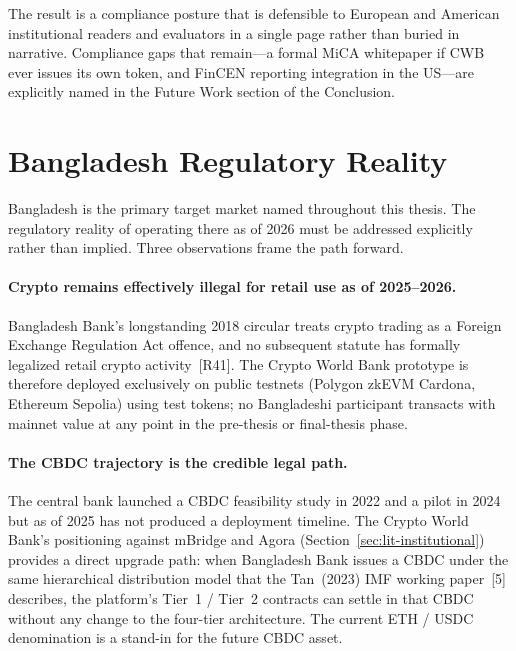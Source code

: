 \documentclass[12pt,a4paper]{report}
\begin{document}
The result is a compliance posture that is defensible to European and American institutional readers and evaluators in a single page rather than buried in narrative. Compliance gaps that remain---a formal MiCA whitepaper if CWB ever issues its own token, and FinCEN reporting integration in the US---are explicitly named in the Future Work section of the Conclusion.

\section{Bangladesh Regulatory Reality}
\label{sec:bangladesh-reg}

Bangladesh is the primary target market named throughout this thesis. The regulatory reality of operating there as of 2026 must be addressed explicitly rather than implied. Three observations frame the path forward.

\paragraph{Crypto remains effectively illegal for retail use as of 2025--2026.}
Bangladesh Bank's longstanding 2018 circular treats crypto trading as a Foreign Exchange Regulation Act offence, and no subsequent statute has formally legalized retail crypto activity~[R41]. The Crypto World Bank prototype is therefore deployed exclusively on public testnets (Polygon zkEVM Cardona, Ethereum Sepolia) using test tokens; no Bangladeshi participant transacts with mainnet value at any point in the pre-thesis or final-thesis phase.

\paragraph{The CBDC trajectory is the credible legal path.}
The central bank launched a CBDC feasibility study in 2022 and a pilot in 2024 but as of 2025 has not produced a deployment timeline. The Crypto World Bank's positioning against mBridge and Agora (Section~\ref{sec:lit-institutional}) provides a direct upgrade path: when Bangladesh Bank issues a CBDC under the same hierarchical distribution model that the Tan~(2023) IMF working paper~[5] describes, the platform's Tier~1 / Tier~2 contracts can settle in that CBDC without any change to the four-tier architecture. The current ETH / USDC denomination is a stand-in for the future CBDC asset.
\end{document}
